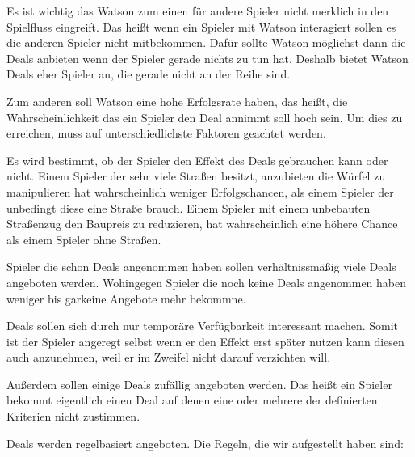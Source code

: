 \documentclass[german]{cgspaper} %
\begin{document}
Es ist wichtig das Watson zum einen für andere Spieler nicht merklich in den Spielfluss eingreift.
Das heißt wenn ein Spieler mit Watson interagiert sollen es die anderen Spieler nicht mitbekommen.
Dafür sollte Watson möglichst dann die Deals anbieten wenn der Spieler gerade nichts zu tun hat.
Deshalb bietet Watson Deals eher Spieler an, die gerade nicht an der Reihe sind.

Zum anderen soll Watson eine hohe Erfolgsrate haben, das heißt, die Wahrscheinlichkeit das ein Spieler den Deal annimmt soll hoch sein.
Um dies zu erreichen, muss auf unterschiedlichste Faktoren geachtet werden. 

Es wird bestimmt, ob der Spieler den Effekt des Deals gebrauchen kann oder nicht. 
Einem Spieler der sehr viele Straßen besitzt, anzubieten die Würfel zu manipulieren hat wahrscheinlich weniger Erfolgschancen, als einem Spieler der unbedingt diese eine Straße brauch.
Einem Spieler mit einem unbebauten Straßenzug den Baupreis zu reduzieren, hat wahrscheinlich eine höhere Chance als einem Spieler ohne Straßen.

Spieler die schon Deals angenommen haben sollen verhältnissmäßig viele Deals angeboten werden.
Wohingegen Spieler die noch keine Deals angenommen haben weniger bis garkeine Angebote mehr bekommne.

Deals sollen sich durch nur temporäre Verfügbarkeit interessant machen.
Somit ist der Spieler angeregt selbst wenn er den Effekt erst später nutzen kann diesen auch anzunehmen, weil er im Zweifel nicht darauf verzichten will.

Außerdem sollen einige Deals zufällig angeboten werden.
Das heißt ein Spieler bekommt eigentlich einen Deal auf denen eine oder mehrere der definierten Kriterien nicht zustimmen.

Deals werden regelbasiert angeboten. Die Regeln, die wir aufgestellt haben sind:
\end{document}
